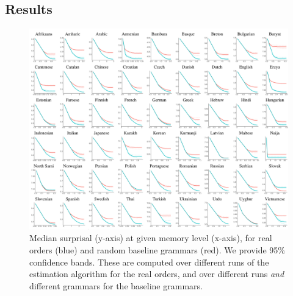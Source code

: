 



\subsection{Results}



\begin{figure}
	\begin{center}
\includegraphics[width=\textwidth]{results-table.pdf}
\end{center}
	\caption{Median surprisal (y-axis) at given memory level (x-axis), for real orders (blue) and random baseline grammars (red). We provide 95\% confidence bands. These are computed over different runs of the estimation algorithm for the real orders, and over different runs \emph{and} different grammars for the baseline grammars.}\label{fig:median-table}
\end{figure}


